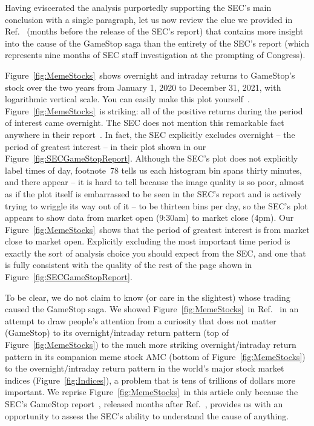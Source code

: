 \documentclass[twocolumn,twoside,prd,floatfix,letterpaper]{revtex4}
\def \lastDataDate {December 31, 2021}
\def \FigMain {Figure~\ref{fig:Indices}}
\def \FigSEC {Figure~\ref{fig:SECGameStopReport}}
\def \FigMeme {Figure~\ref{fig:MemeStocks}}
\begin{document}
Having eviscerated the analysis purportedly supporting the SEC's main conclusion with a single paragraph, let us now review the clue we provided in Ref.~\cite{knuteson2021} (months before the release of the SEC's report) that contains more insight into the cause of the GameStop saga than the entirety of the SEC's report (which represents nine months of SEC staff investigation at the prompting of Congress).

\FigMeme\ shows overnight and intraday returns to GameStop's stock over the two years from January 1, 2020 to \lastDataDate, with logarithmic vertical scale.  You can easily make this plot yourself~\cite{yahooFinance,thisArticleWebpage}.  \FigMeme\ is striking:  all of the positive returns during the period of interest came overnight.  The SEC does not mention this remarkable fact anywhere in their report~\cite{SECGameStopReport}.  In fact, the SEC explicitly excludes overnight -- the period of greatest interest -- in their plot shown in our \FigSEC.  Although the SEC's plot does not explicitly label times of day, footnote~78 tells us each histogram bin spans thirty minutes, and there appear -- it is hard to tell because the image quality is so poor, almost as if the plot itself is embarrassed to be seen in the SEC's report and is actively trying to wriggle its way out of it -- to be thirteen bins per day, so the SEC's plot appears to show data from market open (9:30am) to market close (4pm).  Our \FigMeme\ shows that the period of greatest interest is from market close to market open.  Explicitly excluding the most important time period is exactly the sort of analysis choice you should expect from the SEC, and one that is fully consistent with the quality of the rest of the page shown in \FigSEC.

To be clear, we do not claim to know (or care in the slightest) whose trading caused the GameStop saga.  We showed \FigMeme\ in Ref.~\cite{knuteson2021} in an attempt to draw people's attention from a curiosity that does not matter (GameStop) to its overnight/intraday return pattern (top of \FigMeme) to the much more striking overnight/intraday return pattern in its companion meme stock AMC (bottom of \FigMeme) to the overnight/intraday return pattern in the world's major stock market indices (\FigMain), a problem that is tens of trillions of dollars more important.  We reprise \FigMeme\ in this article only because the SEC's GameStop report~\cite{SECGameStopReport}, released months after Ref.~\cite{knuteson2021}, provides us with an opportunity to assess the SEC's ability to understand the cause of anything.
\end{document}
